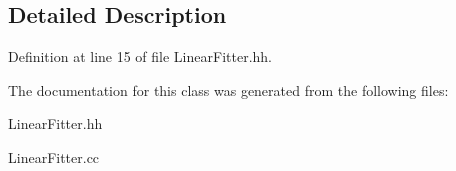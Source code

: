 \subsection{Detailed Description}


Definition at line 15 of file Linear\-Fitter.\-hh.



The documentation for this class was generated from the following files\-:\begin{DoxyCompactItemize}
\item 
Linear\-Fitter.\-hh\item 
Linear\-Fitter.\-cc\end{DoxyCompactItemize}

